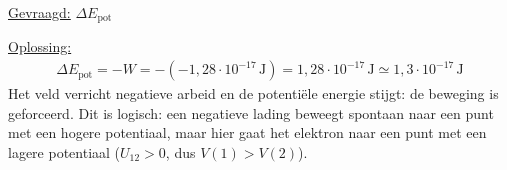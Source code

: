 \documentclass{ximera}
\begin{document}
\begin{exercise}
\begin{question}
\begin{solution}
            \underline{Gevraagd:} $\Delta E_{\text{pot}}$

            \underline{Oplossing:}
            \begin{align*}
                \Delta E_{\text{pot}} = -W = -(-1{,}28 \cdot 10^{-17} \, \mathrm{J}) = 1{,}28 \cdot 10^{-17} \, \mathrm{J} \simeq \boxed{1{,}3 \cdot 10^{-17} \, \mathrm{J}}
            \end{align*}
            Het veld verricht negatieve arbeid en de potentiële energie stijgt: de beweging is geforceerd. Dit is logisch: een negatieve lading beweegt spontaan naar een punt met een hogere potentiaal, maar hier gaat het elektron naar een punt met een lagere potentiaal ($U_{12} > 0$, dus $V(1) > V(2)$).
        \end{solution}
    \end{question}
\end{exercise}
\end{document}
